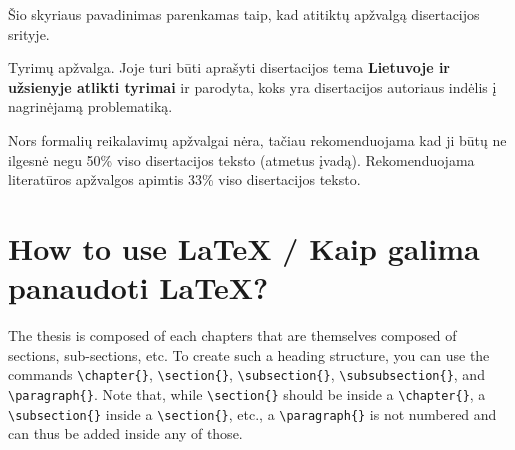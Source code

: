 Šio skyriaus pavadinimas parenkamas taip, kad atitiktų apžvalgą disertacijos srityje.

Tyrimų apžvalga. Joje turi būti aprašyti disertacijos tema \textbf{Lietuvoje ir užsienyje atlikti tyrimai} ir parodyta, koks yra disertacijos autoriaus indėlis į nagrinėjamą problematiką.

Nors formalių reikalavimų apžvalgai nėra, tačiau rekomenduojama kad ji būtų ne ilgesnė negu 50\% viso disertacijos teksto (atmetus įvadą). Rekomenduojama literatūros apžvalgos apimtis 33\% viso disertacijos teksto.


\section{How to use \LaTeX{} / Kaip galima panaudoti \LaTeX{}?}
\label{sec:intro_latex}

The thesis is composed of each chapters that are themselves composed of sections, sub-sections, etc.
To create such a heading structure, you can use the commands \verb|\chapter{}|, \verb|\section{}|, \verb|\subsection{}|, \verb|\subsubsection{}|, and \verb|\paragraph{}|. 
Note that, while \verb|\section{}| should be inside a \verb|\chapter{}|, a \verb|\subsection{}| inside a \verb|\section{}|, etc., a \verb|\paragraph{}| is not numbered and can thus be added inside any of those.

